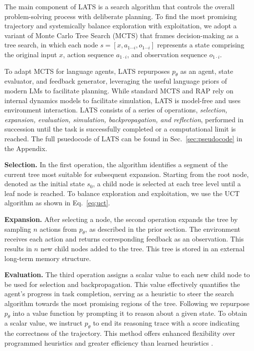 \documentclass{article} \usepackage{iclr2024_conference,times}
\begin{document}
The main component of LATS is a search algorithm that controls the overall problem-solving process with deliberate planning. To find the most promising trajectory and systemically balance exploration with exploitation, we adopt a variant of Monte Carlo Tree Search (MCTS) that frames decision-making as a tree search, in which each node $s=[x, a_{1\cdots i}, o_{1\cdots i}]$ represents a state comprising the original input $x$, action sequence $a_{1\cdot i}$, and observation sequence $o_{1\cdot i}$. 

To adapt MCTS for language agents, LATS repurposes $p_\theta$ as an agent, state evaluator, and feedback generator, leveraging the useful language priors of modern LMs to facilitate planning. While standard MCTS and RAP \cite{hao2023reasoning} rely on internal dynamics models to facilitate simulation, LATS is model-free and uses environment interaction. LATS consists of a series of operations, \textit{selection, expansion, evaluation, simulation, backpropagation, and reflection}, performed in succession until the task is successfully completed or a computational limit is reached. The full psuedocode of LATS can be found in Sec.~\ref{sec:pseudocode} in the Appendix.

\textbf{Selection.}
In the first operation, the algorithm identifies a segment of the current tree most suitable for subsequent expansion. Starting from the root node, denoted as the initial state \(s_0\), a child node is selected at each tree level until a leaf node is reached. To balance exploration and exploitation, we use the UCT algorithm as shown in Eq.~\ref{eq:uct}.
\[
\]


\textbf{Expansion.} 
After selecting a node, the second operation expands the tree by sampling $n$ actions from $p_\theta$, as described in the prior section. The environment receives each action and returns corresponding feedback as an observation. This results in $n$ new child nodes added to the tree. This tree is stored in an external long-term memory structure.

\textbf{Evaluation.} 
The third operation assigns a scalar value to each new child node to be used for selection and backpropagation. This value effectively quantifies the agent's progress in task completion, serving as a heuristic to steer the search algorithm towards the most promising regions of the tree. Following \citet{yao2023tree} we repurpose $p_\theta$ into a value function by prompting it to reason about a given state. To obtain a scalar value, we instruct $p_\theta$ to end its reasoning trace with a score indicating the correctness of the trajectory. This method offers enhanced flexibility over programmed heuristics \citep{campbell2002deep} and greater efficiency than learned heuristics \citep{Silver2017MasteringTG}.
\end{document}
